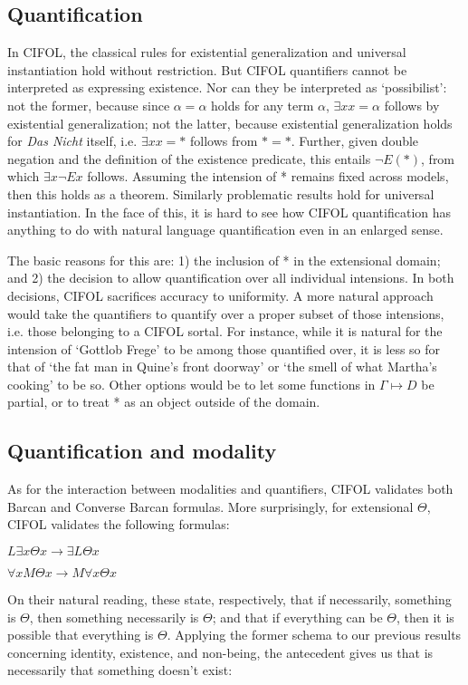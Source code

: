 \documentclass[]{article}
\begin{document}
\subsection{Quantification}
In CIFOL, the classical rules for existential generalization and universal instantiation hold without restriction. But CIFOL quantifiers cannot be interpreted as expressing existence. Nor can they be interpreted as `possibilist': not the former, because since $\alpha = \alpha$ holds for any term $\alpha$, $\exists x x = \alpha $ follows by existential generalization; not the latter, because existential generalization holds for \textit{Das Nicht} itself, i.e. $\exists x x = *$ follows from $*=*$. Further, given double negation and the definition of the existence predicate, this entails $\neg E(*)$, from which $\exists x\neg Ex$ follows. Assuming the intension of * remains fixed across models, then this holds as a theorem. Similarly problematic results hold for universal instantiation. In the face of this, it is hard to see how CIFOL quantification has anything to do with natural language quantification even in an enlarged sense.

The basic reasons for this are: 1) the inclusion of * in the extensional domain; and 2) the decision to allow quantification over all individual intensions. In both decisions, CIFOL sacrifices accuracy to uniformity. A more natural approach would take the quantifiers to quantify over a proper subset of those intensions, i.e. those belonging to a CIFOL sortal. For instance, while it is natural for the intension of `Gottlob Frege' to be among those quantified over, it is less so for that of `the fat man in Quine's front doorway' or `the smell of what Martha's cooking' to be so. Other options would be to let some functions in $\Gamma \mapsto D$ be partial, or to treat * as an object outside of the domain.

\subsection{Quantification and modality}
As for the interaction between modalities and quantifiers, CIFOL validates both Barcan and Converse Barcan formulas. More surprisingly, for extensional $\Theta$, CIFOL validates the following formulas:

$ L\exists x\Theta x\rightarrow \exists L \Theta x$

$\forall x M \Theta x \rightarrow M \forall x \Theta x$

On their natural reading, these state, respectively, that if necessarily, something is $\Theta$, then something necessarily is $\Theta$; and that if everything can be $\Theta$, then it is possible that everything is $\Theta$. Applying the former schema to our previous results concerning identity, existence, and non-being, the antecedent gives us that is necessarily that something doesn't exist:
\end{document}
